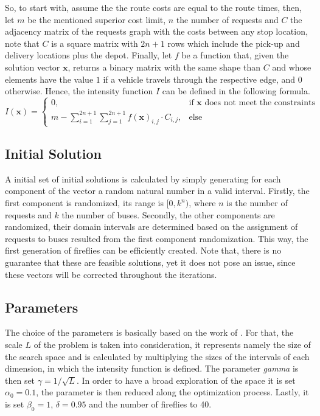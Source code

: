 \documentclass[tuberlin,cic,tc,openright,english,noabntcite,oneside]{iiufrgs}
\begin{document}
So, to start with, assume the the route costs are equal to the route times, then, let $m$ be the mentioned superior cost limit, $n$ the number of requests and $C$ the adjacency matrix of the requests graph with the costs between any stop location, note that $C$ is a square matrix with $2n+1$ rows which include the pick-up and delivery locations plus the depot. Finally, let $f$ be a function that, given the solution vector $\mathbf{x}$, returns a binary matrix with the same shape than $C$ and whose elements have the value $1$ if a vehicle travels through the respective edge, and $0$ otherwise. Hence, the intensity function $I$ can be defined in the following formula.
$$I(\mathbf{x}) = \begin{cases} 0, & \text{if }\mathbf{x}\text{ does not meet the constraints}\\
								m - \displaystyle\sum_{i=1}^{2n+1}\sum_{j=1}^{2n+1} f(\mathbf{x})_{i,j} \cdot C_{i,j}, & \text{else}
					\end{cases}$$

\subsection{Initial Solution}
A initial set of initial solutions is calculated by simply generating for each component of the vector a random natural number in a valid interval. Firstly, the first component is randomized, its range is $[0, k^n)$, where $n$ is the number of requests and $k$ the number of buses. Secondly, the other components are randomized, their domain intervals are determined based on the assignment of requests to buses resulted from the first component randomization. This way, the first generation of fireflies can be efficiently created. Note that, there is no guarantee that these are feasible solutions, yet it does not pose an issue, since these vectors will be corrected throughout the iterations.

\subsection{Parameters}
The choice of the parameters is basically based on the work of \textcite[p. 37-38]{yang_firefly_2013}. For that, the scale $L$ of the problem is taken into consideration, it represents namely the size of the search space and is calculated by multiplying the sizes of the intervals of each dimension, in which the intensity function is defined. The parameter \emph{gamma} is then set $\gamma = 1/\sqrt{L}$. In order to have a broad exploration of the space it is set $\alpha_0 = 0.1$, the parameter is then reduced along the optimization process. Lastly, it is set $\beta_0 = 1$, $\delta = 0.95$ and the number of fireflies to 40.
\end{document}

